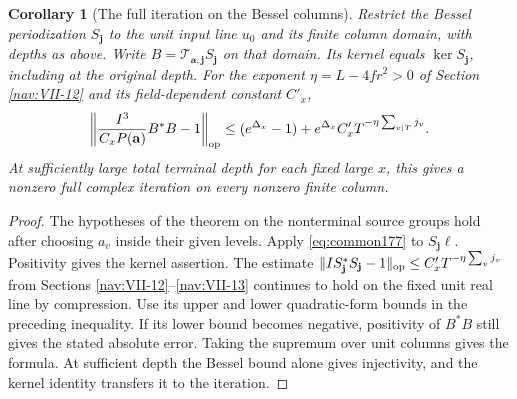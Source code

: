 \documentclass[a4paper,11pt]{article}
\newtheorem{corollary}[proposition]{Corollary}
\theoremstyle{definition}
\theoremstyle{remark}
\numberwithin{equation}{section}
\begin{document}
\begin{corollary}[The full iteration on the Bessel columns]
\label{cor:gram177}
Restrict the Bessel periodization \(S_{\mathbf j}\) to
the unit input line \(u_0\) and its finite column domain,
with depths as above. Write
\(B=\mathcal T_{\mathbf a,\mathbf j}S_{\mathbf j}\) on that
domain. Its kernel equals \(\ker S_{\mathbf j}\), including
at the original depth. For the exponent \(\eta=L-4fr^2>0\)
of Section \ref{nav:VII-12} and its field-dependent constant \(C'_x\),
\[
 \left\|\frac{I^3}{C_x P(\mathbf a)} B^*B-1\right\|_{\rm op}
       \le (e^{\Delta_x}-1)
           +e^{\Delta_x} C'_x T^{-\eta\sum_{v\mid T}j_v}.
\]
At sufficiently large total terminal depth for each fixed
large \(x\), this gives a nonzero full complex iteration
on every nonzero finite column.
\end{corollary}
\begin{proof}
The hypotheses of the theorem on the nonterminal source
groups hold after choosing \(a_v\) inside their given
levels. Apply \eqref{eq:common177} to \(S_{\mathbf j}\ell\).
Positivity gives the kernel assertion. The estimate
\(\|I S_{\mathbf j}^*S_{\mathbf j}-1\|_{\rm op}
\le C'_x T^{-\eta\sum_v j_v}\) from Sections \ref{nav:VII-12}--\ref{nav:VII-13}
continues to hold on the fixed unit real line by compression.
Use its upper and lower quadratic-form bounds in the preceding
inequality. If its lower bound becomes negative, positivity
of \(B^*B\) still gives the stated absolute error. Taking
the supremum over unit columns gives the formula. At
sufficient depth the Bessel bound alone gives injectivity,
and the kernel identity transfers it to the iteration.
\end{proof}
\end{document}
